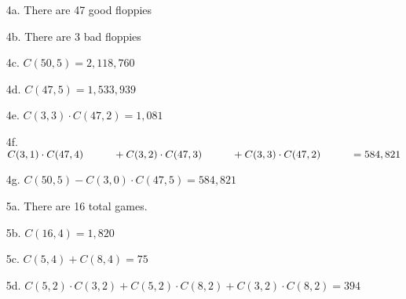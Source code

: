 {\begin{itemize}
        \item[4a.]  There are 47 good floppies
        \item[4b.]  There are 3 bad floppies
        \item[4c.]  $C(50,5) = 2,118,760$
        \item[4d.]  $C(47,5) = 1,533,939$
        \item[4e.]  $C(3,3) \cdot C(47,2) = 1,081$
        \item[4f.]  $C(3,1) \cdot C(47,4) \hspace*{1cm} + C(3,2) \cdot C(47,3) \hspace*{1cm} + C(3,3) \cdot C(47,2) \hspace*{1cm} = 584,821$ \\
        \item[4g.]  $C(50,5) - C(3,0) \cdot C(47,5) = 584,821$

        \item[5a.]  There are 16 total games.
        \item[5b.]  $C(16,4) = 1,820$
        \item[5c.]  $C(5,4) + C(8,4) = 75$
        \item[5d.]  $C(5,2) \cdot C(3,2) + C(5,2) \cdot C(8,2) + C(3,2) \cdot C(8,2) = 394$
    \end{itemize}
}


